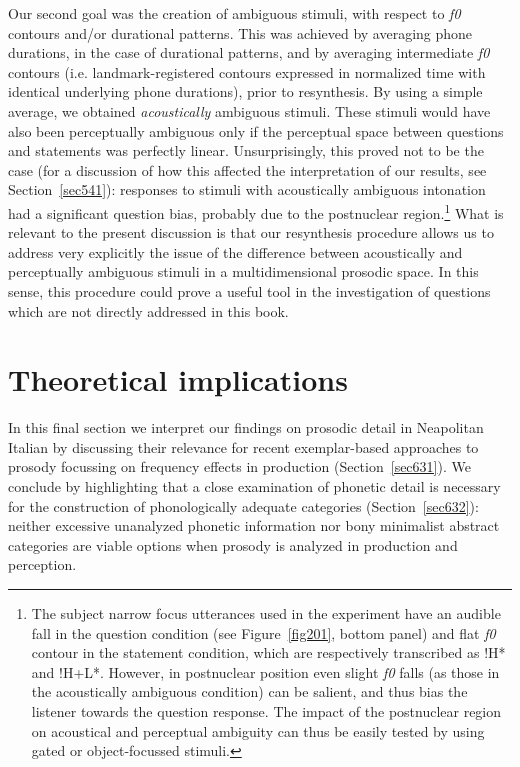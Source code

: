 Our second goal was the creation of ambiguous stimuli, with respect to \textit{f0} contours and/or durational patterns. This was achieved by averaging phone durations, in the case of durational patterns, and by averaging intermediate \textit{f0} contours (i.e. landmark-registered contours expressed in normalized time with identical underlying phone durations), prior to resynthesis. By using a simple average, we obtained \textit{acoustically} ambiguous stimuli. These stimuli would have also been perceptually ambiguous only if the perceptual space between questions and statements was perfectly linear. Unsurprisingly, this proved not to be the case (for a discussion of how this affected the interpretation of our results, see Section~\ref{sec541}): responses to stimuli with acoustically ambiguous intonation had a significant question bias, probably due to the postnuclear region.\footnote{The subject narrow focus utterances used in the experiment have an audible fall in the question condition (see Figure~\ref{fig201}, bottom panel) and flat \textit{f0} contour in the statement condition, which are respectively transcribed as !H* and !H+L*. However, in postnuclear position even slight \textit{f0} falls (as those in the acoustically ambiguous condition) can be salient, and thus bias the listener towards the question response. The impact of the postnuclear region on acoustical and perceptual ambiguity can thus be easily tested by using gated or object-focussed stimuli.} What is relevant to the present discussion is that our resynthesis procedure allows us to address very explicitly the issue of the difference between acoustically and perceptually ambiguous stimuli in a multidimensional prosodic space. In this sense, this procedure could prove a useful tool in the investigation of questions which are not directly addressed in this book.

\section{Theoretical implications}\label{sec63}
In this final section we interpret our findings on prosodic detail in Neapolitan Italian by discussing their relevance for recent exemplar-based approaches to prosody focussing on frequency effects in production (Section~\ref{sec631}). We conclude by highlighting that a close examination of phonetic detail is necessary for the construction of phonologically adequate categories (Section~\ref{sec632}): neither excessive unanalyzed phonetic information nor bony minimalist abstract categories are viable options when prosody is analyzed in production and perception.

